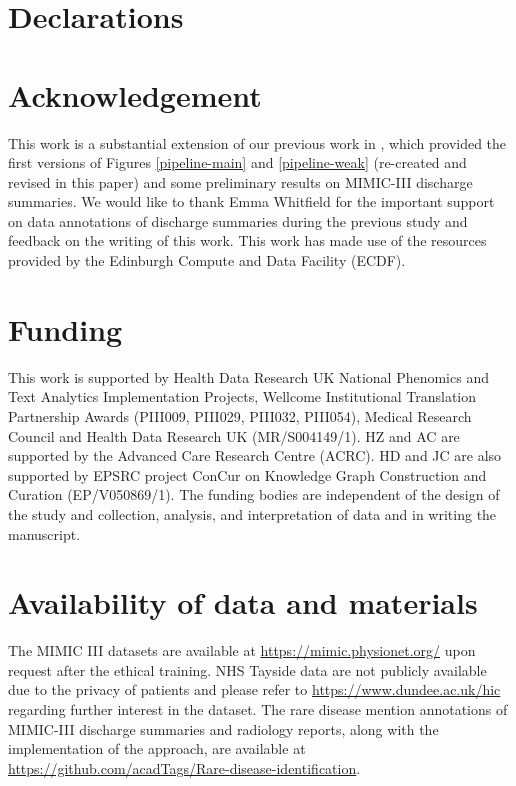 \documentclass[twocolumn]{bmcart}
\begin{document}
\section*{Declarations}
\begin{backmatter}
\section*{Acknowledgement}
This work is a substantial extension of our previous work in \cite{dong2021rare}, which provided the first versions of Figures \ref{pipeline-main} and \ref{pipeline-weak} (re-created and revised in this paper) and some preliminary results on MIMIC-III discharge summaries. We would like to thank Emma Whitfield for the important support on data annotations of discharge summaries during the previous study \cite{dong2021rare} and feedback on the writing of this work. This work has made use of the resources provided by the Edinburgh Compute and Data Facility (ECDF).

\section*{Funding}This work is supported by Health Data Research UK National Phenomics and Text Analytics Implementation Projects, Wellcome Institutional Translation Partnership Awards (PIII009, PIII029, PIII032, PIII054), Medical Research Council and Health Data Research UK (MR/S004149/1). HZ and AC are supported by the Advanced Care Research Centre (ACRC). HD and JC are also supported by EPSRC project ConCur on Knowledge Graph Construction and Curation (EP/V050869/1). The funding bodies are independent of the design of the study and collection, analysis, and interpretation of data and in writing the manuscript.

\section*{Availability of data and materials}The MIMIC III datasets are available at \url{https://mimic.physionet.org/} upon request after the ethical training. NHS Tayside data are not publicly available due to the privacy of patients and please refer to \url{https://www.dundee.ac.uk/hic} regarding further interest in the dataset. The rare disease mention annotations of MIMIC-III discharge summaries and radiology reports, along with the implementation of the approach, are available at \url{https://github.com/acadTags/Rare-disease-identification}.


\end{backmatter}
\end{document}
